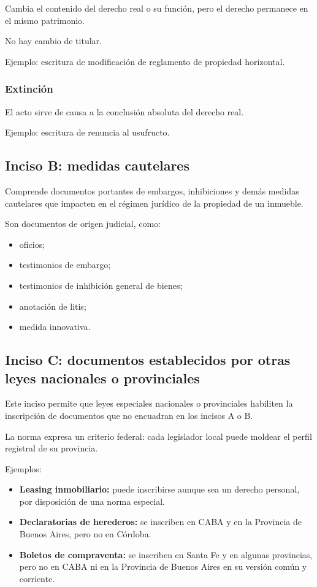 \documentclass[12pt]{book}
\begin{document}
Cambia el contenido del derecho real o su funci\'on, pero el derecho permanece en el mismo patrimonio.

No hay cambio de titular.

Ejemplo: escritura de modificaci\'on de reglamento de propiedad horizontal.

\subsubsection{Extinci\'on}

El acto sirve de causa a la conclusi\'on absoluta del derecho real.

Ejemplo: escritura de renuncia al usufructo.

\subsection{Inciso B: medidas cautelares}

Comprende documentos portantes de embargos, inhibiciones y dem\'as medidas cautelares que impacten en el r\'egimen jur\'idico de la propiedad de un inmueble.

Son documentos de origen judicial, como:

\begin{itemize}
    \item oficios;
    \item testimonios de embargo;
    \item testimonios de inhibici\'on general de bienes;
    \item anotaci\'on de litis;
    \item medida innovativa.
\end{itemize}

\subsection{Inciso C: documentos establecidos por otras leyes nacionales o provinciales}

Este inciso permite que leyes especiales nacionales o provinciales habiliten la inscripci\'on de documentos que no encuadran en los incisos A o B.

La norma expresa un criterio federal: cada legislador local puede moldear el perfil registral de su provincia.

Ejemplos:

\begin{itemize}
    \item \textbf{Leasing inmobiliario:} puede inscribirse aunque sea un derecho personal, por disposici\'on de una norma especial.
    \item \textbf{Declaratorias de herederos:} se inscriben en CABA y en la Provincia de Buenos Aires, pero no en C\'ordoba.
    \item \textbf{Boletos de compraventa:} se inscriben en Santa Fe y en algunas provincias, pero no en CABA ni en la Provincia de Buenos Aires en su versi\'on com\'un y corriente.
\end{itemize}
\end{document}
